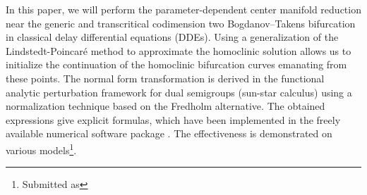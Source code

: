 In this paper, we will perform the parameter-dependent center manifold reduction
near the generic and transcritical codimension two Bogdanov--Takens bifurcation
in classical delay differential equations (DDEs). Using a generalization of the
Lindstedt-Poincar\'e method to approximate the homoclinic solution allows us to
initialize the continuation of the homoclinic bifurcation curves emanating from
these points. The normal form transformation is derived in the functional
analytic perturbation framework for dual semigroups (sun-star calculus) using a
normalization technique based on the Fredholm alternative. The obtained
expressions give explicit formulas, which have been implemented in the freely
available numerical software package \DDEBIFTOOL. The effectiveness is
demonstrated on various models\ifthesis\footnote{Submitted as}\fi.
